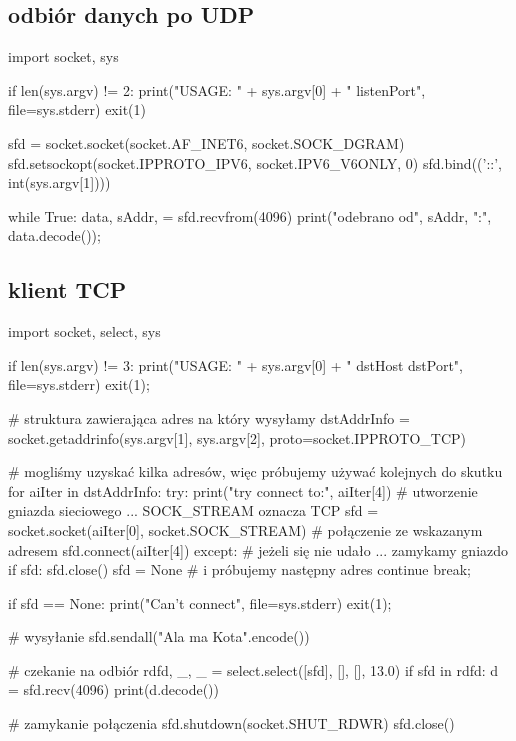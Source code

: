 \documentclass{pdfBooklets}
\begin{document}
\subsection{odbiór danych po UDP}
\begin{CodeFrame*}[python]{}
import socket, sys

if len(sys.argv) != 2:
  print("USAGE: " + sys.argv[0] + " listenPort", file=sys.stderr)
  exit(1)

sfd = socket.socket(socket.AF_INET6, socket.SOCK_DGRAM)
sfd.setsockopt(socket.IPPROTO_IPV6, socket.IPV6_V6ONLY, 0)
sfd.bind(('::', int(sys.argv[1])))

while True:
  data, sAddr, = sfd.recvfrom(4096)
  print("odebrano od", sAddr, ":", data.decode());
\end{CodeFrame*}

\subsection{klient TCP}
\begin{CodeFrame*}[python]{}
import socket, select, sys

if len(sys.argv) != 3:
	print("USAGE: " + sys.argv[0] + " dstHost dstPort", file=sys.stderr)
	exit(1);

# struktura zawierająca adres na który wysyłamy
dstAddrInfo = socket.getaddrinfo(sys.argv[1], sys.argv[2], proto=socket.IPPROTO_TCP)

# mogliśmy uzyskać kilka adresów, więc próbujemy używać kolejnych do skutku
for aiIter in dstAddrInfo:
	try:
		print("try connect to:", aiIter[4])
		# utworzenie gniazda sieciowego ... SOCK_STREAM oznacza TCP
		sfd = socket.socket(aiIter[0], socket.SOCK_STREAM)
		# połączenie ze wskazanym adresem
		sfd.connect(aiIter[4])
	except:
		# jeżeli się nie udało ... zamykamy gniazdo
		if sfd:
			sfd.close()
		sfd = None
		# i próbujemy następny adres
		continue
	break;

if sfd == None:
	print("Can't connect", file=sys.stderr)
	exit(1);

# wysyłanie
sfd.sendall("Ala ma Kota\n".encode())

# czekanie na odbiór
rdfd, _, _ = select.select([sfd], [], [], 13.0)
if sfd in rdfd:
	d = sfd.recv(4096)
	print(d.decode())

# zamykanie połączenia
sfd.shutdown(socket.SHUT_RDWR)
sfd.close()
\end{CodeFrame*}
\end{document}
